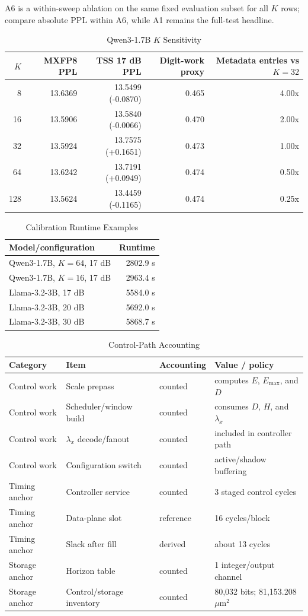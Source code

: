 \documentclass[10pt]{article}
\begin{document}
\begin{table}[!ht]
\caption{Qwen3-1.7B \(K\) Sensitivity}
A6 is a within-sweep ablation on the same fixed evaluation subset for all \(K\)
rows; compare absolute PPL within A6, while A1 remains the full-test headline.
\begin{tabular}{rrrrr}
\toprule
\(K\) & MXFP8 PPL & TSS 17 dB PPL & Digit-work proxy & Metadata entries vs \(K=32\) \\
\midrule
8 & 13.6369 & 13.5499 (-0.0870) & 0.465 & 4.00x \\
16 & 13.5906 & 13.5840 (-0.0066) & 0.470 & 2.00x \\
32 & 13.5924 & 13.7575 (+0.1651) & 0.473 & 1.00x \\
64 & 13.6242 & 13.7191 (+0.0949) & 0.474 & 0.50x \\
128 & 13.5624 & 13.4459 (-0.1165) & 0.474 & 0.25x \\
\bottomrule
\end{tabular}
\end{table}

\begin{table}[!ht]
\caption{Calibration Runtime Examples}
\begin{tabular}{lr}
\toprule
Model/configuration & Runtime \\
\midrule
Qwen3-1.7B, \(K=64\), 17 dB & 2802.9 s \\
Qwen3-1.7B, \(K=16\), 17 dB & 2963.4 s \\
Llama-3.2-3B, 17 dB & 5584.0 s \\
Llama-3.2-3B, 20 dB & 5692.0 s \\
Llama-3.2-3B, 30 dB & 5868.7 s \\
\bottomrule
\end{tabular}
\end{table}

\begin{table}[!ht]
\caption{Control-Path Accounting}
\begin{tabular}{llll}
\toprule
Category & Item & Accounting & Value / policy \\
\midrule
Control work & Scale prepass & counted & computes \(E\), \(E_{\max}\), and \(D\) \\
Control work & Scheduler/window build & counted & consumes \(D\), \(H\), and \(\lambda_x\) \\
Control work & \(\lambda_x\) decode/fanout & counted & included in controller path \\
Control work & Configuration switch & counted & active/shadow buffering \\
Timing anchor & Controller service & counted & 3 staged control cycles \\
Timing anchor & Data-plane slot & reference & 16 cycles/block \\
Timing anchor & Slack after fill & derived & about 13 cycles \\
Storage anchor & Horizon table & counted & 1 integer/output channel \\
Storage anchor & Control/storage inventory & counted & 80,032 bits; 81,153.208 \(\mu\mathrm{m}^2\) \\
\bottomrule
\end{tabular}
\end{table}
\end{document}
